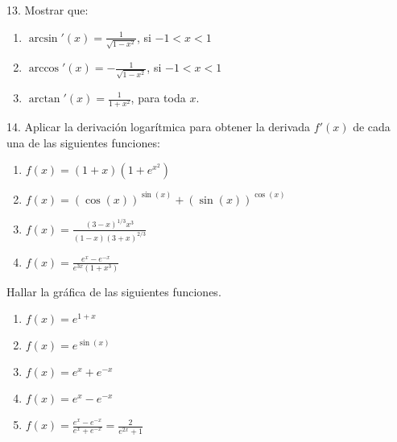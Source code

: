 \documentclass[12pt]{article}
\begin{document}
13. Mostrar que:

\begin{enumerate}[\hspace{9px} a)]
    \item \(\arcsin'(x)=\displaystyle\frac{1}{\sqrt{1-x^2}}\), si \(-1<x<1\)
    
    \item \(\arccos'(x)=\displaystyle-\frac{1}{\sqrt{1-x^2}}\), si \(-1<x<1\)
    
    \item \(\arctan'(x)=\displaystyle\frac{1}{1+x^2}\), para toda $x$.

\end{enumerate}

14. Aplicar la derivaci\'on logar\'itmica para obtener la derivada $f'(x)$ de cada una de las siguientes funciones:

\begin{enumerate}[\hspace{9px} a)]
    \item \(f(x)=(1+x)(1+e^{x^2})\)
    
    \item \(f(x)=(\cos(x))^{\sin(x)}+(\sin(x))^{\cos(x)}\)
    
    \item \(f(x)=\displaystyle\frac{(3-x)^{1/3}x^3}{(1-x)(3+x)^{2/3}}\)
    
    \item \(f(x)=\displaystyle\frac{e^x-e^{-x}}{e^{3x}(1+x^3)}\)
    
\end{enumerate}

Hallar la gr\'afica de las siguientes funciones.

\begin{enumerate}[\hspace{9px} a)]
    \item \(f(x)=e^{1+x}\)
    
    \item \(f(x)=e^{\sin(x)}\)
    
    \item \(f(x)=e^x+e^{-x}\)
    
    \item \(f(x)=e^x-e^{-x}\)
    
    \item \(f(x)=\displaystyle\frac{e^x-e^{-x}}{e^x+e^{-x}}=\frac{2}{e^{2x}+1}\)

\end{enumerate}
\end{document}
